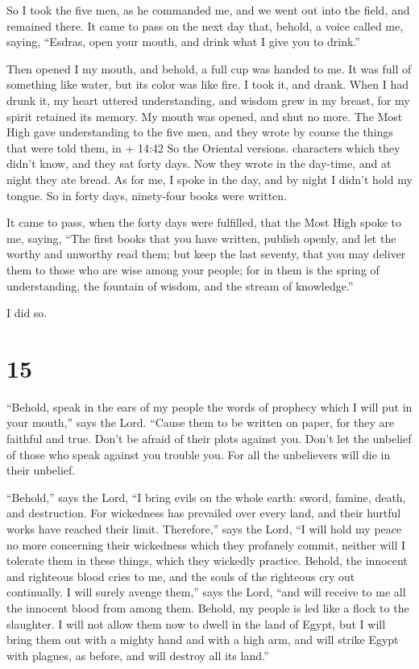  So I took the five men, as he commanded me, and we went
out into the field, and remained there.  It came to pass on
the next day that, behold, a voice called me, saying, ``Esdras, open
your mouth, and drink what I give you to drink.''

 Then opened I my mouth, and behold, a full cup was handed
to me. It was full of something like water, but its color was like fire.
 I took it, and drank. When I had drunk it, my heart
uttered understanding, and wisdom grew in my breast, for my spirit
retained its memory.  My mouth was opened, and shut no
more.  The Most High gave understanding to the five men,
and they wrote by course the things that were told them, in + 14:42 So
the Oriental versions. characters which they didn't know, and they sat
forty days. Now they wrote in the day-time, and at night they ate bread.
 As for me, I spoke in the day, and by night I didn't hold
my tongue.  So in forty days, ninety-four books were
written.

 It came to pass, when the forty days were fulfilled, that
the Most High spoke to me, saying, ``The first books that you have
written, publish openly, and let the worthy and unworthy read them;
 but keep the last seventy, that you may deliver them to
those who are wise among your people;  for in them is the
spring of understanding, the fountain of wisdom, and the stream of
knowledge.''

 I did so.

\hypertarget{section-14}{%
\section{15}\label{section-14}}

 ``Behold, speak in the ears of my people the words of
prophecy which I will put in your mouth,'' says the Lord. 
``Cause them to be written on paper, for they are faithful and true.
 Don't be afraid of their plots against you. Don't let the
unbelief of those who speak against you trouble you.  For
all the unbelievers will die in their unbelief.

 ``Behold,'' says the Lord, ``I bring evils on the whole
earth: sword, famine, death, and destruction.  For
wickedness has prevailed over every land, and their hurtful works have
reached their limit.  Therefore,'' says the Lord,
 ``I will hold my peace no more concerning their wickedness
which they profanely commit, neither will I tolerate them in these
things, which they wickedly practice. Behold, the innocent and righteous
blood cries to me, and the souls of the righteous cry out continually.
 I will surely avenge them,'' says the Lord, ``and will
receive to me all the innocent blood from among them. 
Behold, my people is led like a flock to the slaughter. I will not allow
them now to dwell in the land of Egypt,  but I will bring
them out with a mighty hand and with a high arm, and will strike Egypt
with plagues, as before, and will destroy all its land.''

